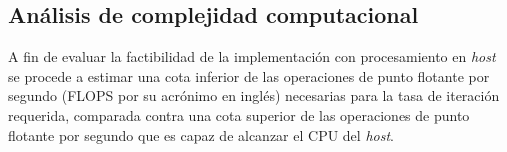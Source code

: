 \color{RoyalBlue}
\subsection{Análisis de complejidad computacional}

A fin de evaluar la factibilidad de la implementación con procesamiento en \textit{host} se procede a estimar una cota inferior de las operaciones de punto flotante por segundo (FLOPS por su acrónimo en inglés) necesarias para la tasa de iteración requerida, comparada contra una cota superior de las operaciones de punto flotante por segundo que es capaz de alcanzar el CPU del \textit{host}. 

